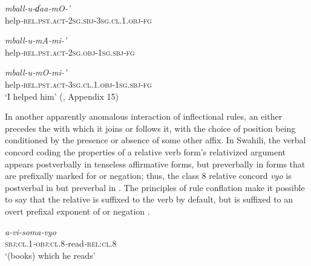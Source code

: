 \documentclass[output=paper,
modfonts
]{LSP/langsci}
\begin{document}
	\ex \label{ex:stump:8b} {\itshape mball\nobreakdash-u\nobreakdash-ɗaa\nobreakdash-mO\nobreakdash-’}\\
	{help\textit{\nobreakdash-}\textsc{rel.pst.act}\textsc{\nobreakdash-}\textsc{2sg.sbj}\textsc{\nobreakdash-}\textsc{3sg.cl.1.obj}\textsc{\nobreakdash-fg}}\\
	
	\ex \label{ex:stump:8c} {\itshape mball\nobreakdash-u\nobreakdash-mA\nobreakdash-mi\nobreakdash-’}\\
	{help\textit{\nobreakdash-}\textsc{rel.pst.act}\textsc{\nobreakdash-}\textsc{2}\textsc{sg.obj}\textsc{\nobreakdash-}\textsc{1sg}\textsc{.}\textsc{sbj}\textsc{\nobreakdash-fg}}\\
	
	\ex \label{ex:stump:8d} {\itshape mball\nobreakdash-u\nobreakdash-mO\nobreakdash-mi\nobreakdash-’}\\
	{help\textit{\nobreakdash-}\textsc{rel.pst.act}\textsc{\nobreakdash-}\textsc{3sg.cl.1.obj}\textsc{\nobreakdash-}\textsc{1sg.sbj}\textsc{\nobreakdash-fg}}\\
	\glt ‘I helped him’ \hfill (\citealt{Arnott1970}, Appendix 15)\\
	
	\z
\z

In another apparently anomalous interaction of inflectional rules,  an  either precedes the  with which it joins or follows it, with the choice of position being conditioned by the presence or absence of some other affix.  In Swahili, the verbal concord coding the properties of a relative verb form’s relativized argument appears postverbally in tenseless affirmative forms, but preverbally in forms that are prefixally marked for  or negation; thus, the class 8 relative concord \textit{vyo} is postverbal in  but preverbal in .  The principles of rule conflation make it possible to say that the relative  is suffixed to the verb  by default, but is suffixed to an overt prefixal exponent of  or negation \citep{stump}.

\ea%
    \label{ex:stump:9}
    	\ea \label{ex:stump:9a}
	\gll \textit{a\nobreakdash-vi\nobreakdash-soma\nobreakdash-vyo} \\ 
	\textsc{sbj:cl.}1\textit{\nobreakdash-}\textsc{obj:cl.}8\textit{\nobreakdash-}read\textit{\nobreakdash-}\textsc{rel:cl.}8 \\
	 \glt ‘(books) which he reads’
	 
\end{document}
